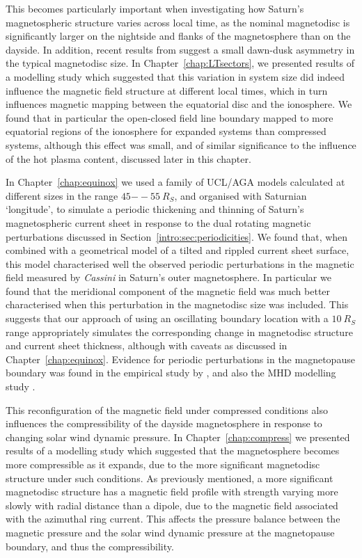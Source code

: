 This becomes particularly important when investigating how Saturn's magnetospheric structure varies across local time, as the nominal magnetodisc is significantly larger on the nightside and flanks of the magnetosphere than on the dayside. In addition, recent results from \citet{pilkington2015b} suggest a small dawn-dusk asymmetry in the typical magnetodisc size. In Chapter~\ref{chap:LTsectors}, we presented results of a modelling study which suggested that this variation in system size did indeed influence the magnetic field structure at different local times, which in turn influences magnetic mapping between the equatorial disc and the ionosphere. We found that in particular the open-closed field line boundary mapped to more equatorial regions of the ionosphere for expanded systems than compressed systems, although this effect was small, and of similar significance to the influence of the hot plasma content, discussed later in this chapter.

In Chapter~\ref{chap:equinox} we used a family of UCL/AGA models calculated at different sizes in the range $45{--}\SI{55}{R_S}$, and organised with Saturnian `longitude',  to simulate a periodic thickening and thinning of Saturn's magnetospheric current sheet in response to the dual rotating magnetic perturbations discussed in Section~\ref{intro:sec:periodicities}. We found that, when combined with a geometrical model of a tilted and rippled current sheet surface, this model characterised well the observed periodic perturbations in the magnetic field measured by \textit{Cassini} in Saturn's outer magnetosphere. In particular we found that the meridional component of  the magnetic field was much better characterised when this perturbation in the magnetodisc size was included. This suggests that our approach of using an oscillating boundary location with a $\SI{10}{R_S}$ range appropriately simulates the corresponding change in magnetodisc structure and current sheet thickness, although with caveats as discussed in Chapter~\ref{chap:equinox}. Evidence for periodic perturbations in  the magnetopause boundary was found in the empirical study by \citet{clarke2010}, and also the MHD modelling study \citet{kivelson2014}.

This reconfiguration of the magnetic field under compressed conditions also influences the compressibility of the dayside magnetosphere in response to changing solar wind dynamic pressure. In Chapter~\ref{chap:compress} we presented results of a modelling study which suggested that the magnetosphere becomes more compressible as it expands, due to the more significant magnetodisc structure under such conditions. As previously mentioned, a more significant magnetodisc structure has a magnetic field profile  with strength varying more slowly with radial distance than a  dipole, due to the magnetic field associated with the azimuthal ring current. This affects the pressure balance between the magnetic pressure and the solar wind dynamic pressure at the magnetopause boundary, and thus the compressibility.

